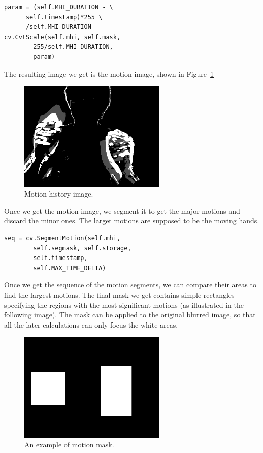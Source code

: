 \documentclass[10pt,twocolumn,letterpaper]{article}
\begin{document}
\begin{verbatim}
param = (self.MHI_DURATION - \
      self.timestamp)*255 \
      /self.MHI_DURATION
cv.CvtScale(self.mhi, self.mask, 
        255/self.MHI_DURATION,
        param)
\end{verbatim}

The resulting image we get is the motion image, shown in Figure~\ref{fig:motion}
\begin{figure}[h]
\centering
\includegraphics[width=7cm]{motion.png}
\caption{Motion history image.}
\label{fig:motion}
\end{figure}

Once we get the motion image, we segment it to get the major motions 
and discard the minor ones. The larget motions are supposed to be the moving hands.
\begin{verbatim}
seq = cv.SegmentMotion(self.mhi, 
        self.segmask, self.storage, 
        self.timestamp,
        self.MAX_TIME_DELTA) 
\end{verbatim}
Once we get the sequence of the motion segments, we can compare 
their areas to find the largest motions. The final mask we get 
contains simple rectangles specifying the regions with the most 
significant motions (as illustrated in the following image). The 
mask can be applied to the original blurred image, so that all 
the later calculations can only focus the white areas.
\begin{figure}[h]
\centering
\includegraphics[width=7cm]{block.png}
\caption{An example of motion mask.}
\label{fig:motionmask}
\end{figure}
\end{document}
